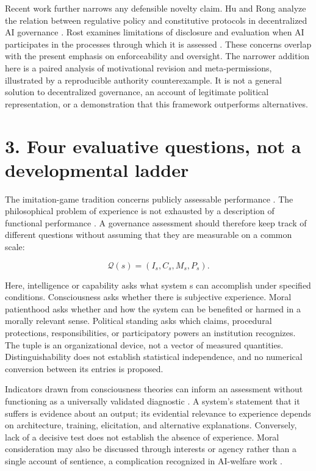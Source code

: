 \documentclass[11pt,a4paper]{article}
\begin{document}
Recent work further narrows any defensible novelty claim. Hu and Rong analyze the relation between regulative policy and constitutive protocols in decentralized AI governance \cite{ref-21}. Rost examines limitations of disclosure and evaluation when AI participates in the processes through which it is assessed \cite{ref-22}. These concerns overlap with the present emphasis on enforceability and oversight. The narrower addition here is a paired analysis of motivational revision and meta-permissions, illustrated by a reproducible authority counterexample. It is not a general solution to decentralized governance, an account of legitimate political representation, or a demonstration that this framework outperforms alternatives.

\hypertarget{section-4}{%
\section{3. Four evaluative questions, not a developmental ladder}\label{section-4}}

The imitation-game tradition concerns publicly assessable performance \cite{ref-17}. The philosophical problem of experience is not exhausted by a description of functional performance \cite{ref-18}. A governance assessment should therefore keep track of different questions without assuming that they are measurable on a common scale:

\[
\mathcal{Q}(s)=(I_s,C_s,M_s,P_s).
\]

Here, intelligence or capability asks what system s can accomplish under specified conditions. Consciousness asks whether there is subjective experience. Moral patienthood asks whether and how the system can be benefited or harmed in a morally relevant sense. Political standing asks which claims, procedural protections, responsibilities, or participatory powers an institution recognizes. The tuple is an organizational device, not a vector of measured quantities. Distinguishability does not establish statistical independence, and no numerical conversion between its entries is proposed.

Indicators drawn from consciousness theories can inform an assessment without functioning as a universally validated diagnostic \cite{ref-2}. A system's statement that it suffers is evidence about an output; its evidential relevance to experience depends on architecture, training, elicitation, and alternative explanations. Conversely, lack of a decisive test does not establish the absence of experience. Moral consideration may also be discussed through interests or agency rather than a single account of sentience, a complication recognized in AI-welfare work \cite{ref-3}.
\end{document}

